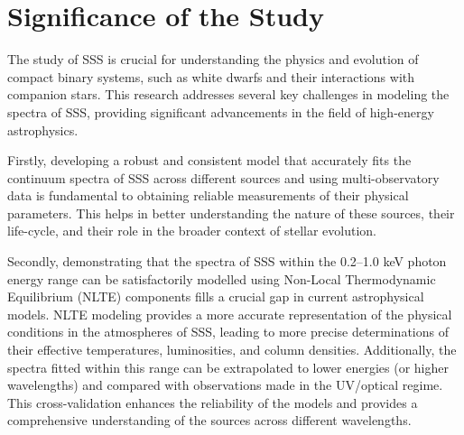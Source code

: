     
    \section{Significance of the Study} \label{introduction:significance}
    	The study of SSS is crucial for understanding the physics and evolution of compact binary systems, such as white dwarfs and their interactions with companion stars. This research addresses several key challenges in modeling the spectra of SSS, providing significant advancements in the field of high-energy astrophysics.
    	
    	Firstly, developing a robust and consistent model that accurately fits the continuum spectra of SSS across different sources and using multi-observatory data is fundamental to obtaining reliable measurements of their physical parameters. This helps in better understanding the nature of these sources, their life-cycle, and their role in the broader context of stellar evolution.
    	
    	Secondly, demonstrating that the spectra of SSS within the 0.2--1.0 keV photon energy range can be satisfactorily modelled using Non-Local Thermodynamic Equilibrium (NLTE) components fills a crucial gap in current astrophysical models. NLTE modeling provides a more accurate representation of the physical conditions in the atmospheres of SSS, leading to more precise determinations of their effective temperatures, luminosities, and column densities. Additionally, the spectra fitted within this range can be extrapolated to lower energies (or higher wavelengths) and compared with observations made in the UV/optical regime. This cross-validation enhances the reliability of the models and provides a comprehensive understanding of the sources across different wavelengths.
    	
